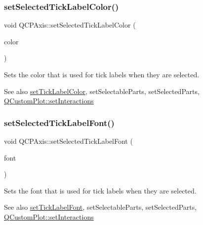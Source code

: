 \subsubsection{\texorpdfstring{set\+Selected\+Tick\+Label\+Color()}{setSelectedTickLabelColor()}}
{\footnotesize\ttfamily void Q\+C\+P\+Axis\+::set\+Selected\+Tick\+Label\+Color (\begin{DoxyParamCaption}\item[{const Q\+Color \&}]{color }\end{DoxyParamCaption})}

Sets the color that is used for tick labels when they are selected.

\begin{DoxySeeAlso}{See also}
\hyperlink{class_q_c_p_axis_a395e445c3fe496b935bee7b911ecfd1c}{set\+Tick\+Label\+Color}, set\+Selectable\+Parts, set\+Selected\+Parts, \hyperlink{class_q_custom_plot_a5ee1e2f6ae27419deca53e75907c27e5}{Q\+Custom\+Plot\+::set\+Interactions} 
\end{DoxySeeAlso}
\mbox{\label{class_q_c_p_axis_a845ccb560b7bc5281098a5be494145f6}} 
\subsubsection{\texorpdfstring{set\+Selected\+Tick\+Label\+Font()}{setSelectedTickLabelFont()}}
{\footnotesize\ttfamily void Q\+C\+P\+Axis\+::set\+Selected\+Tick\+Label\+Font (\begin{DoxyParamCaption}\item[{const Q\+Font \&}]{font }\end{DoxyParamCaption})}

Sets the font that is used for tick labels when they are selected.

\begin{DoxySeeAlso}{See also}
\hyperlink{class_q_c_p_axis_a2b8690c4e8dbc39d9185d2b398ce7a6c}{set\+Tick\+Label\+Font}, set\+Selectable\+Parts, set\+Selected\+Parts, \hyperlink{class_q_custom_plot_a5ee1e2f6ae27419deca53e75907c27e5}{Q\+Custom\+Plot\+::set\+Interactions} 
\end{DoxySeeAlso}
\mbox{\label{class_q_c_p_axis_a8360502685eb782edbf04019c9345cdc}} 

